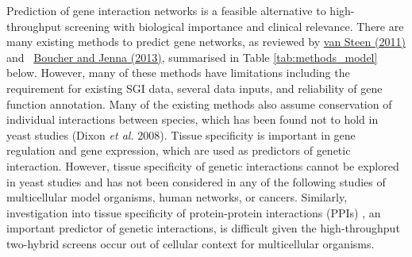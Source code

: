 Prediction of gene interaction networks is a feasible alternative to high-throughput screening with biological importance and clinical relevance. There are many existing methods to predict gene networks, as reviewed by \hyperlink{ENREF104}{van Steen (2011)} and \ \hyperlink{ENREF16}{Boucher and Jenna (2013)}, summarised in Table \ref{tab:methods_model} below. However, many of these methods have limitations including the requirement for existing SGI data, several data inputs, and reliability of gene function annotation. Many of the existing methods also assume conservation of individual interactions between species, which has been found not to hold in yeast studies (Dixon\textit{ et al.} 2008). Tissue specificity is important in gene regulation and gene expression, which are used as predictors of genetic interaction. However, tissue specificity of genetic interactions cannot be explored in yeast studies and has not been considered in any of the following studies of multicellular model organisms, human networks, or cancers. Similarly, investigation into tissue specificity of protein-protein interactions (PPIs) , an important predictor of genetic interactions, is difficult given the high-throughput two-hybrid screens occur out of cellular context for multicellular organisms.  

